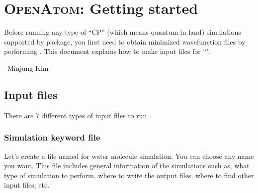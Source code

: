 %
%
%
%
%
%
%
%

\section{\textsc{OpenAtom}: Getting started}

Before running any type of ``CP'' (which means quantum in \openatom land) simulations supported by \openatom package, you first need to obtain minimized wavefunction files by performing {\selectfont{cp\_wave\_min}}. 
This document explains how to make input files for ``{\selectfont{cp\_wave\_min}}".

--Minjung Kim



\subsection{Input files}

There are 7 different types of input files to run \openatom. 

\subsubsection{Simulation keyword file}

Let's create a file named {\selectfont{water.input}} for water molecule simulation. You can choose any name you want. This file includes general information of the simulations such as, what  type of simulation to perform, where to write the output files, where to find other input files, etc. 

